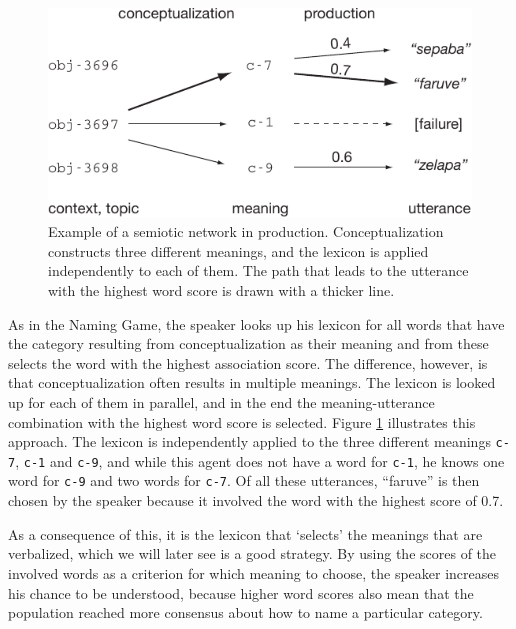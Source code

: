 \begin{figure}[t]
  \includegraphics{figures/sgg-semiotic-network-production}
  \caption{Example of a semiotic network in
    production. Conceptualization constructs three different meanings,
    and the lexicon is applied independently to each of them. The path
    that leads to the utterance with the highest word score is drawn
    with a thicker line. }
  \label{f:sgg-semiotic-network-production}
\end{figure}

 As
in the Naming Game, the speaker looks up his lexicon for all words
that have the category resulting from conceptualization as their
meaning and from these selects the word with the highest association
score. The difference, however, is that conceptualization often
results in multiple meanings. The lexicon is looked up for each of
them in parallel, and in the end the meaning-utterance combination
with the highest word score is selected. Figure
\ref{f:sgg-semiotic-network-production} illustrates this approach. The
lexicon is independently applied to the three different meanings
\texttt{c-7}, \texttt{c-1} and \texttt{c-9}, and while this agent does
not have a word for \texttt{c-1}, he knows one word for \texttt{c-9}
and two words for \texttt{c-7}. Of all these utterances, ``faruve'' is
then chosen by the speaker because it involved the word with the
highest score of 0.7.

As a consequence of this, it is the lexicon that `selects' the
meanings that are verbalized, which we will later see is a good
strategy. By using the scores of the involved words as a criterion for
which meaning to choose, the speaker increases his chance to be
understood, because higher word scores also mean that the population
reached more consensus about how to name a particular category.


